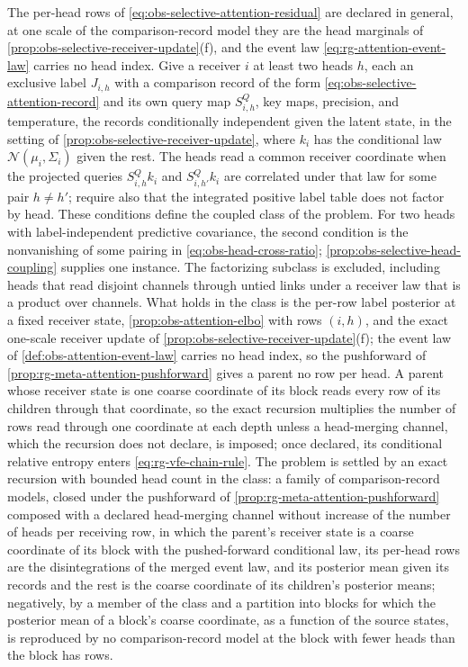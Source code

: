 The per-head rows of \eqref{eq:obs-selective-attention-residual} are declared
in general, at one scale of the comparison-record model they are the head
marginals of \cref{prop:obs-selective-receiver-update}(f), and the event law \eqref{eq:rg-attention-event-law} carries no head index. Give
a receiver \(i\) at least two heads \(h\), each an exclusive label \(J_{i,h}\)
with a comparison record of the form \eqref{eq:obs-selective-attention-record}
and its own query map \(S^Q_{i,h}\), key maps, precision, and temperature, the
records conditionally independent given the latent state, in the setting of
\cref{prop:obs-selective-receiver-update}, where \(k_i\) has the conditional
law \(\mathcal N(\mu_i,\Sigma_i)\) given the rest. The heads read a common
receiver coordinate when the projected queries \(S^Q_{i,h}k_i\) and
\(S^Q_{i,h'}k_i\) are correlated under that law for some pair \(h\ne h'\);
require also that the integrated positive label table does not factor by
head. These conditions define the coupled class of the problem. For two
heads with label-independent predictive covariance, the second condition
is the nonvanishing of some pairing in
\cref{eq:obs-head-cross-ratio}; \cref{prop:obs-selective-head-coupling}
supplies one instance. The factorizing subclass is excluded, including
heads that read disjoint channels through untied links under a receiver law
that is a product over channels.
What holds in the class is the per-row label posterior at a fixed receiver
state, \cref{prop:obs-attention-elbo} with rows \((i,h)\), and the exact
one-scale receiver update of \cref{prop:obs-selective-receiver-update}(f); the event law of
\cref{def:obs-attention-event-law} carries no head index, so the pushforward
of \cref{prop:rg-meta-attention-pushforward} gives a parent no row per head.
A parent whose receiver state is one coarse coordinate of its block
reads every row of its children through that coordinate, so the exact
recursion multiplies the number of rows read through one coordinate at each
depth unless a head-merging channel, which the recursion does not declare, is
imposed; once declared, its conditional relative entropy enters
\eqref{eq:rg-vfe-chain-rule}. The problem is settled by an exact recursion
with bounded head count in the class: a family of comparison-record models,
closed under the pushforward of \cref{prop:rg-meta-attention-pushforward}
composed with a declared head-merging channel without increase of the number
of heads per receiving row, in which the parent's receiver state is a coarse
coordinate of its block with the pushed-forward conditional law, its per-head
rows are the disintegrations of the merged event law, and its posterior mean
given its records and the rest is the coarse coordinate of its children's
posterior means; negatively, by a member of the class and a partition into
blocks for which the posterior mean of a block's coarse coordinate, as a
function of the source states, is reproduced by no comparison-record model
at the block with fewer heads than the block has rows.

